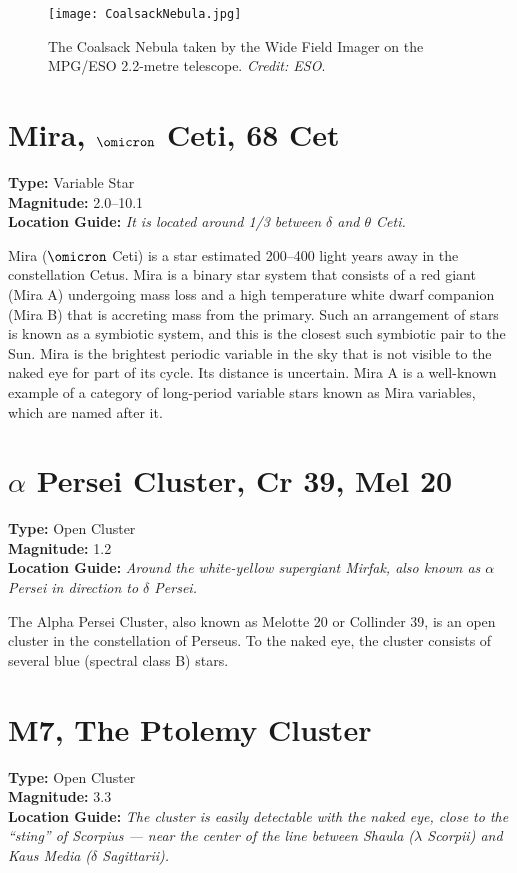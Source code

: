 \begin{figure}[ht]
\centering
\texttt{[image: CoalsackNebula.jpg]}
\caption{The Coalsack Nebula taken by the Wide Field Imager on the MPG/ESO 2.2-metre telescope. \emph{Credit: ESO}.}
\label{fig:CoalsackNebula}
\end{figure}

\section{Mira, \texorpdfstring{$\omicron$}{omicron} Ceti, 68 Cet}
\textbf{Type:} Variable Star \\
\textbf{Magnitude:} 2.0--10.1 \\ 
\textbf{Location Guide:} \textit{It is located around 1/3 between $\delta$ and $\theta$ Ceti.}

Mira ($\omicron$ Ceti) is a star estimated 200--400 light years away
in the constellation Cetus. Mira is a binary star system that consists
of a red giant (Mira A) undergoing mass loss and a high temperature
white dwarf companion (Mira B) that is accreting mass from the
primary. Such an arrangement of stars is known as a symbiotic system,
and this is the closest such symbiotic pair to the Sun. Mira is the
brightest periodic variable in the sky that is not visible to the
naked eye for part of its cycle. Its distance is uncertain. Mira A is
a well-known example of a category of long-period variable stars known as Mira
variables, which are named after it.

\section{\texorpdfstring{$\alpha$}{alpha} Persei Cluster, Cr 39, Mel 20}
\textbf{Type:} Open Cluster \\
\textbf{Magnitude:} 1.2 \\ 
\textbf{Location Guide:} \textit{Around the white-yellow supergiant Mirfak, also known as $\alpha$ Persei in direction to $\delta$ Persei.}

The Alpha Persei Cluster, also known as Melotte 20 or Collinder 39, is
an open cluster in the constellation of Perseus. To the naked
eye, %
the cluster consists of several blue (spectral class B) stars.

\section{M7, The Ptolemy Cluster}
\textbf{Type:} Open Cluster \\
\textbf{Magnitude:} 3.3 \\
\textbf{Location Guide:} \textit{The cluster is easily detectable with
  the naked eye, close to the ``sting'' of Scorpius --- near the
  center of the line between Shaula ($\lambda$ Scorpii) and Kaus Media
  ($\delta$ Sagittarii).}

